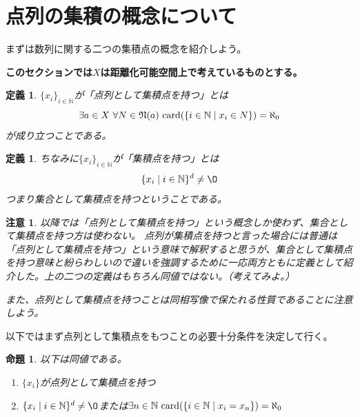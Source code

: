 \documentclass[leqno]{jsarticle}
\newtheorem{prop}[thm]{命題}
\newtheorem{df}[thm]{定義}
\newtheorem*{cau}{注意}
\newcommand{\nn}{\mathbb{N}}
\newcommand{\card}{\text{{\rm card}}}
\begin{document}
\section{点列の集積の概念について}
まずは数列に関する二つの集積点の概念を紹介しよう。
\par
\textbf{このセクションでは$X$は距離化可能空間上で考えているものとする。}
\begin{df}
$\{x_i\}_{i\in \nn}$が「点列として集積点を持つ」とは
\[
\exists a\in X\ \forall N\in \mathfrak{N}(a)\ \card(\{i\in \nn\mid x_i\in N\})=\aleph_0
\]
が成り立つことである。
\end{df}

\begin{df}
ちなみに$\{x_i\}_{i\in \nn}$が「集積点を持つ」とは
\[
\{x_i\mid i\in \nn\}^d\neq \O
\]
つまり集合として集積点を持つということである。
\end{df}
\begin{cau}
以降では「点列として集積点を持つ」という概念しか使わず、集合として集積点を持つ方は使わない。
点列が集積点を持つと言った場合には普通は「点列として集積点を持つ」という意味で解釈すると思うが、集合として集積点を持つ意味と紛らわしいので違いを強調するために一応両方ともに定義として紹介した。上の二つの定義はもちろん同値ではない。（考えてみよ。）
\par
また、点列として集積点を持つことは同相写像で保たれる性質であることに注意しよう。
\end{cau}
以下ではまず点列として集積点をもつことの必要十分条件を決定して行く。
\begin{prop}\label{aaa}
以下は同値である。
\begin{enumerate}
\item $\{x_i\}$が点列として集積点を持つ
\item $\{x_i\mid i\in \nn\}^d\neq \O$または$\exists n\in \nn\ \card(\{i\in \nn\mid x_i=x_n\})=\aleph_0$
\end{enumerate}
\end{prop}
\end{document}
